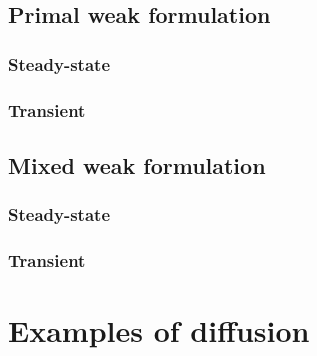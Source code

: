 \documentclass{article}
\theoremstyle{definition}
\begin{document}
\subsection{Primal weak formulation}
\subsubsection{Steady-state}


\subsubsection{Transient}



\subsection{Mixed weak formulation}
\subsubsection{Steady-state}


\subsubsection{Transient}




\section{Examples of diffusion}
\label{section:examples_of_transport_phenomena}
\end{document}
